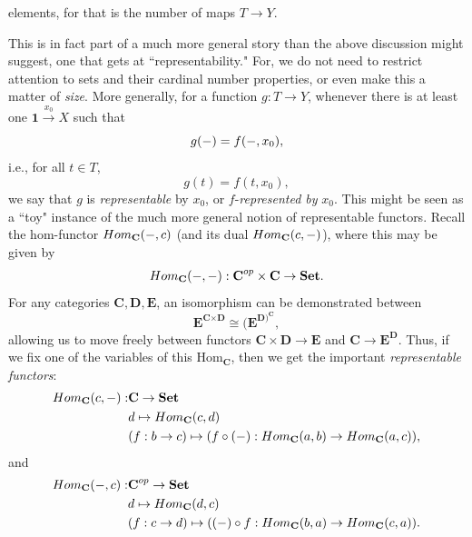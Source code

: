 \documentclass[11pt]{book}
\theoremstyle{definition}
\theoremstyle{definition}
\theoremstyle{definition}
\theoremstyle{theorem}
\theoremstyle{definition}
\begin{document}
elements, for that is the number of maps $T \rightarrow Y$. \par 
This is in fact part of a much more general story than the above discussion might suggest, one that gets at ``representability." For, we do not need to restrict attention to sets and their cardinal number properties, or even make this a matter of \textit{size}. More generally, for a function $g: T \rightarrow Y$, whenever there is at least one $\textbf{1} \xrightarrow{x_0} X$ such that 
\begin{equation*}
g(\--) = f(\--, x_0),
\end{equation*}  
i.e., for all $t \in T$, 
\begin{equation*}
g(t) = f(t, x_0),
\end{equation*} we say that $g$ is \textit{representable} by $x_0$, or $f$-\textit{represented by} $x_0$. This might be seen as a ``toy" instance of the much more general notion of representable functors. Recall the hom-functor $Hom_{\textbf{C}}(\--, c)$ (and its dual $Hom_{\textbf{C}}(c, \--)$), where this may be given by 
\begin{equation*}
Hom_{\textbf{C}}(\--, \--): \textbf{C}^{op} \times \textbf{C} \rightarrow \textbf{Set}. 
\end{equation*}
For any categories $\textbf{C}, \textbf{D}, \textbf{E}$, an isomorphism can be demonstrated between 
\begin{equation*}
\textbf{E}^{\textbf{C} \times \textbf{D}} \cong (\textbf{E}^{\textbf{D})^{\textbf{C}}},
\end{equation*}
allowing us to move freely between functors $\textbf{C} \times \textbf{D} \rightarrow \textbf{E}$ and $\textbf{C} \rightarrow \textbf{E}^{\textbf{D}}$. Thus, if we fix one of the variables of this Hom$_{\textbf{C}}$, then we get the important \textit{representable functors}: 
\begin{align*} 
Hom_{\textbf{C}}(c, \--) : & \textbf{C} \rightarrow \textbf{Set} \\ 
& d \mapsto Hom_{\textbf{C}}(c, d) \\ 
& (f: b \rightarrow c) \mapsto (f \circ (\--): Hom_{\textbf{C}}(a,b) \rightarrow Hom_{\textbf{C}}(a,c)),
\end{align*} 
and 
\begin{align*} 
Hom_{\textbf{C}}(\--, c) : & \textbf{C}^{op} \rightarrow \textbf{Set} \\ 
& d \mapsto Hom_{\textbf{C}}(d, c) \\ 
& (f: c \rightarrow d) \mapsto ((\--) \circ f: Hom_{\textbf{C}}(b,a) \rightarrow Hom_{\textbf{C}}(c,a)).
\end{align*} 
\end{document}
